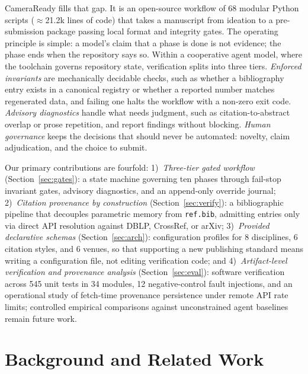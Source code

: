 \documentclass[conference]{IEEEtran}
\begin{document}
CameraReady fills that gap. It is an open-source workflow of 68 modular Python scripts ($\approx$21.2k lines of code) that takes a manuscript from ideation to a pre-submission package passing local format and integrity gates. The operating principle is simple: a model's claim that a phase is done is not evidence; the phase ends when the repository says so. Within a cooperative agent model, where the toolchain governs repository state, verification splits into three tiers. \textit{Enforced invariants} are mechanically decidable checks, such as whether a bibliography entry exists in a canonical registry or whether a reported number matches regenerated data, and failing one halts the workflow with a non-zero exit code. \textit{Advisory diagnostics} handle what needs judgment, such as citation-to-abstract overlap or prose repetition, and report findings without blocking. \textit{Human governance} keeps the decisions that should never be automated: novelty, claim adjudication, and the choice to submit.

Our primary contributions are fourfold:
1)~\textit{Three-tier gated workflow} (Section~\ref{sec:gates}): a state machine governing ten phases through fail-stop invariant gates, advisory diagnostics, and an append-only override journal;
2)~\textit{Citation provenance by construction} (Section~\ref{sec:verify}): a bibliographic pipeline that decouples parametric memory from \texttt{ref.bib}, admitting entries only via direct API resolution against DBLP, CrossRef, or arXiv;
3)~\textit{Provided declarative schemas} (Section~\ref{sec:arch}): configuration profiles for 8 disciplines, 6 citation styles, and 6 venues, so that supporting a new publishing standard means writing a configuration file, not editing verification code; and
4)~\textit{Artifact-level verification and provenance analysis} (Section~\ref{sec:eval}): software verification across 545 unit tests in 34 modules, 12 negative-control fault injections, and an operational study of fetch-time provenance persistence under remote API rate limits; controlled empirical comparisons against unconstrained agent baselines remain future work.

\section{Background and Related Work}
\end{document}
